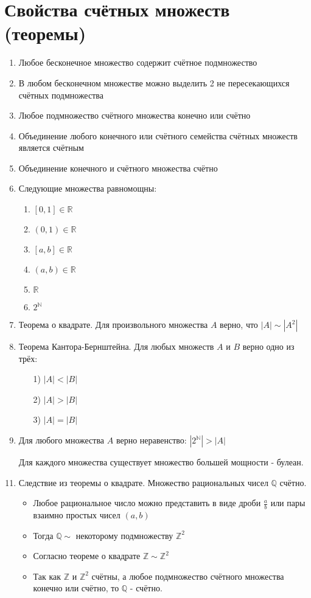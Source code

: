 \documentclass[10pt]{article}
\begin{document}
\section*{Свойства счётных множеств (теоремы)}
\begin{enumerate}
    \item Любое бесконечное множество содержит счётное подмножество
    \item В любом бесконечном множестве можно выделить 2 не пересекающихся счётных подмножества
    \item Любое подмножество счётного множества конечно или счётно
    \item Объединение любого конечного или счётного семейства счётных множеств является счётным
    \item Объединение конечного и счётного множества счётно
    \item Следующие множества равномощны:
        \begin{enumerate}
            \item $[0, 1] \in \mathbb{R}$
            \item $(0, 1) \in \mathbb{R}$
            \item $[a, b] \in \mathbb{R}$
            \item $(a, b) \in \mathbb{R}$
            \item $\mathbb{R}$
            \item $2^{\mathbb{N}}$
        \end{enumerate}
    \item Теорема о квадрате. Для произвольного множества $A$ верно, что $|A| \sim |A^2|$
    \item Теорема Кантора-Бернштейна. Для любых множеств $A$ и $B$ верно одно из трёх:
        \begin{enumerate}
            \item[1)] $|A| < |B|$
            \item[2)] $|A| > |B|$
            \item[3)] $|A| = |B|$
        \end{enumerate}
    \item Для любого множества $A$ верно неравенство: $|2^\mathbb{N}| > |A|$
    \item[] Для каждого множества существует множество большей мощности - булеан.
    \item Следствие из теоремы о квадрате. Множество рациональных чисел $\mathbb{Q}$ счётно.
        \begin{itemize}
            \item Любое рациональное число можно представить в виде дроби $\frac{a}{b}$ или пары взаимно простых чисел $(a, b)$
            \item Тогда $\mathbb{Q} \sim$ некоторому подмножеству $\mathbb{Z}^2$
            \item Согласно теореме о квадрате $\mathbb{Z} \sim \mathbb{Z}^2$
            \item Так как $\mathbb{Z}$ и $\mathbb{Z}^2$ счётны, а любое подмножество счётного множества конечно или счётно, то $\mathbb{Q}$ - счётно.
        \end{itemize}
\end{enumerate}
\end{document}
